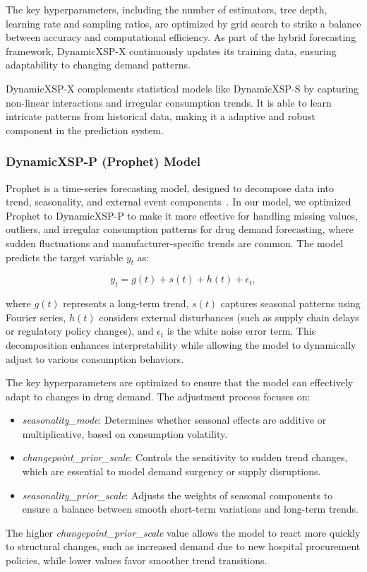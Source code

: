 \documentclass[12pt]{article}
\begin{document}
The key hyperparameters, including the number of estimators, tree depth, learning rate and sampling ratios, are optimized by grid search to strike a balance between accuracy and computational efficiency. As part of the hybrid forecasting framework, DynamicXSP-X continuously updates its training data, ensuring adaptability to changing demand patterns.

DynamicXSP-X complements statistical models like DynamicXSP-S by capturing non-linear interactions and irregular consumption trends. It is able to learn intricate patterns from historical data, making it a adaptive and robust component in the prediction system.

\subsubsection{DynamicXSP-P (Prophet) Model}

Prophet is a time-series forecasting model, designed to decompose data into trend, seasonality, and external event components~\cite{kwarteng2024prophet}. In our model, we optimized Prophet to DynamicXSP-P to make it more effective for handling missing values, outliers, and irregular consumption patterns for drug demand forecasting, where sudden fluctuations and manufacturer-specific trends are common. The model predicts the target variable \(y_t\) as:

\begin{equation}
y_{t} = g(t) + s(t) + h(t) + \epsilon_{t},
\end{equation}

where \(g(t)\) represents a long-term trend, \(s(t)\) captures seasonal patterns using Fourier series, \(h(t)\) considers external disturbances (such as supply chain delays or regulatory policy changes), and \(\epsilon_{t}\) is the white noise error term. This decomposition enhances interpretability while allowing the model to dynamically adjust to various consumption behaviors.

The key hyperparameters are optimized to ensure that the model can effectively adapt to changes in drug demand. The adjustment process focuses on:
\begin{itemize}
    \item \textit{seasonality\_mode}: Determines whether seasonal effects are additive or multiplicative, based on consumption volatility.
    \item \textit{changepoint\_prior\_scale}: Controls the sensitivity to sudden trend changes, which are essential to model demand surgency or supply disruptions.
    \item \textit{seasonality\_prior\_scale}: Adjusts the weights of seasonal components to ensure a balance between smooth short-term variations and long-term trends.
\end{itemize}
The higher \textit{changepoint\_prior\_scale} value allows the model to react more quickly to structural changes, such as increased demand due to new hospital procurement policies, while lower values favor smoother trend transitions.
\end{document}
